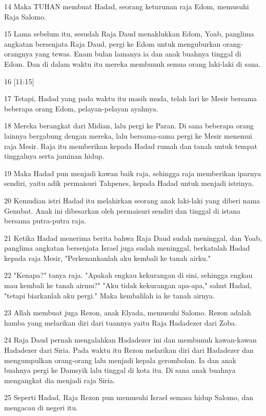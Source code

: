 \par 14 Maka TUHAN membuat Hadad, seorang keturunan raja Edom, memusuhi Raja Salomo.
\par 15 Lama sebelum itu, sesudah Raja Daud menaklukkan Edom, Yoab, panglima angkatan bersenjata Raja Daud, pergi ke Edom untuk menguburkan orang-orangnya yang tewas. Enam bulan lamanya ia dan anak buahnya tinggal di Edom. Dan di dalam waktu itu mereka membunuh semua orang laki-laki di sana.
\par 16 [11:15]
\par 17 Tetapi, Hadad yang pada waktu itu masih muda, telah lari ke Mesir bersama beberapa orang Edom, pelayan-pelayan ayahnya.
\par 18 Mereka berangkat dari Midian, lalu pergi ke Paran. Di sana beberapa orang lainnya bergabung dengan mereka, lalu bersama-sama pergi ke Mesir menemui raja Mesir. Raja itu memberikan kepada Hadad rumah dan tanah untuk tempat tinggalnya serta jaminan hidup.
\par 19 Maka Hadad pun menjadi kawan baik raja, sehingga raja memberikan iparnya sendiri, yaitu adik permaisuri Tahpenes, kepada Hadad untuk menjadi istrinya.
\par 20 Kemudian istri Hadad itu melahirkan seorang anak laki-laki yang diberi nama Genubat. Anak ini dibesarkan oleh permaisuri sendiri dan tinggal di istana bersama putra-putra raja.
\par 21 Ketika Hadad menerima berita bahwa Raja Daud sudah meninggal, dan Yoab, panglima angkatan bersenjata Israel juga sudah meninggal, berkatalah Hadad kepada raja Mesir, "Perkenankanlah aku kembali ke tanah airku."
\par 22 "Kenapa?" tanya raja. "Apakah engkau kekurangan di sini, sehingga engkau mau kembali ke tanah airmu?" "Aku tidak kekurangan apa-apa," sahut Hadad, "tetapi biarkanlah aku pergi." Maka kembalilah ia ke tanah airnya.
\par 23 Allah membuat juga Rezon, anak Elyada, memusuhi Salomo. Rezon adalah hamba yang melarikan diri dari tuannya yaitu Raja Hadadezer dari Zoba.
\par 24 Raja Daud pernah mengalahkan Hadadezer ini dan membunuh kawan-kawan Hadadezer dari Siria. Pada waktu itu Rezon melarikan diri dari Hadadezer dan mengumpulkan orang-orang lalu menjadi kepala gerombolan. Ia dan anak buahnya pergi ke Damsyik lalu tinggal di kota itu. Di sana anak buahnya mengangkat dia menjadi raja Siria.
\par 25 Seperti Hadad, Raja Rezon pun memusuhi Israel semasa hidup Salomo, dan mengacau di negeri itu.
